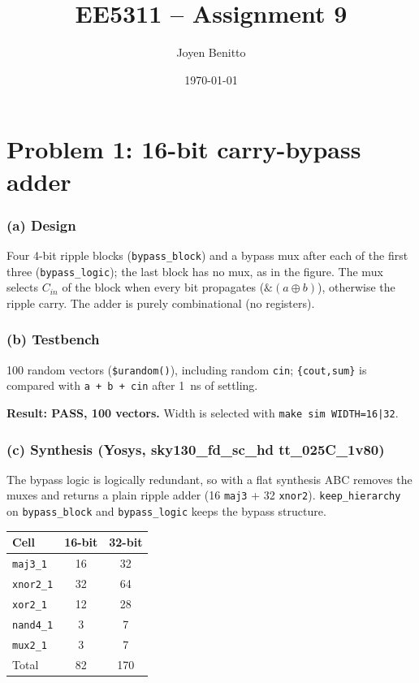 \title{EE5311 -- Assignment 9}
\author{Joyen Benitto}
\date{\today}
\maketitle

\section{Problem 1: 16-bit carry-bypass adder}

\subsubsection{(a) Design}

Four 4-bit ripple blocks (\texttt{bypass\_block}) and a bypass mux after each of the first three (\texttt{bypass\_logic}); the last block has no mux, as in the figure. The mux selects $C_{in}$ of the block when every bit propagates ($\&(a \oplus b)$), otherwise the ripple carry. The adder is purely combinational (no registers).

\subsubsection{(b) Testbench}

100 random vectors (\texttt{\$urandom()}), including random \texttt{cin}; \texttt{\{cout,sum\}} is compared with \texttt{a + b + cin} after 1~ns of settling.

\textbf{Result: PASS, 100 vectors.} Width is selected with \texttt{make sim WIDTH=16|32}.

\subsubsection{(c) Synthesis (Yosys, sky130\_fd\_sc\_hd tt\_025C\_1v80)}

The bypass logic is logically redundant, so with a flat synthesis ABC removes the muxes and returns a plain ripple adder (16 \texttt{maj3} + 32 \texttt{xnor2}). \texttt{keep\_hierarchy} on \texttt{bypass\_block} and \texttt{bypass\_logic} keeps the bypass structure.

\begin{center}
\begin{tabular}{lcc}
\hline
Cell & 16-bit & 32-bit \\
\hline
\texttt{maj3\_1} & 16 & 32 \\
\texttt{xnor2\_1} & 32 & 64 \\
\texttt{xor2\_1} & 12 & 28 \\
\texttt{nand4\_1} & 3 & 7 \\
\texttt{mux2\_1} & 3 & 7 \\
\hline
Total & 82 & 170 \\
\hline
\end{tabular}
\end{center}

